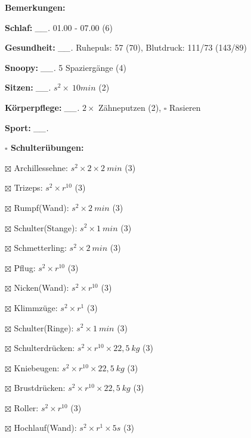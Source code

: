 \documentclass[10pt,a4paper]{article}
\newcommand\prop[1] {{\color {alizarin} {\bf #1}}}             %
\newcommand\mand[1] {{\color {burntorange} {\bf #1}}}          %
\newcommand\topspace{\vskip -15pt \hskip 20pt}
\newcommand\n[1] { {\sl #1.} \hskip 5pt }
\begin{document}
\begin{mdframed}[style=daystyle]
  \begin{labeling}{{\mand {Bemerkungen:}}}
    \setlength\itemsep{-3pt}
  \item[{\mand {Schlaf:}}]        \n{\_\_} 01.00 - 07.00 (6)
  \item[{\mand {Gesundheit:}}]    \n{\_\_} Ruhepuls: 57 (70), Blutdruck: 111/73 (143/89)
  \item[{\mand {Snoopy:}}]        \n{\_\_} 5 Spaziergänge (4)  
  \item[{\mand {Sitzen:}}]        \n{\_\_} $s^2 \times\ 10 min$ (2)
  \item[{\mand {Körperpflege:}}]  \n{\_\_} $2 \times$ Zähneputzen (2), $\square$ Rasieren
  \item[{\mand {Sport:}}]         \n{\_\_}
    \topspace
    \begin{minipage}{0.75\textwidth}  
      \begin{labeling}{\prop {$\square$ {Schulterübungen:}}} 
        \setlength\itemsep{-3pt}
      \item[$\boxtimes$ Archillessehne:]   $s^2 \times 2 \times 2\ min$ (3)
      \item[$\boxtimes$ Trizeps:]          $s^2 \times r^{10}$ (3)
      \item[$\boxtimes$ Rumpf(Wand):]      $s^2 \times 2\ min$ (3)
      \item[$\boxtimes$ Schulter(Stange):] $s^2 \times 1\ min$ (3)
      \item[$\boxtimes$ Schmetterling:]    $s^2 \times 2\ min$ (3)
      \item[$\boxtimes$ Pflug:]            $s^2 \times r^{10}$ (3)
      \item[$\boxtimes$ Nicken(Wand):]     $s^2 \times r^{10}$ (3)
      \item[$\boxtimes$ Klimmzüge:]        $s^2 \times r^1$ (3)
      \item[$\boxtimes$ Schulter(Ringe):]  $s^2 \times 1\ min$ (3)
      \item[$\boxtimes$ Schulterdrücken:]  $s^2 \times r^{10} \times 22,5\ kg$ (3)
      \item[$\boxtimes$ Kniebeugen:]       $s^2 \times r^{10} \times 22,5\ kg$ (3)
      \item[$\boxtimes$ Brustdrücken:]     $s^2 \times r^{10} \times 22,5\ kg$ (3)
      \item[$\boxtimes$ Roller:]           $s^2 \times r^{10}$ (3)
      \item[$\boxtimes$ Hochlauf(Wand):]   $s^2 \times r^{1} \times 5s$ (3)

\end{labeling}
\end{minipage}
\end{labeling}
\end{mdframed}
\end{document}
